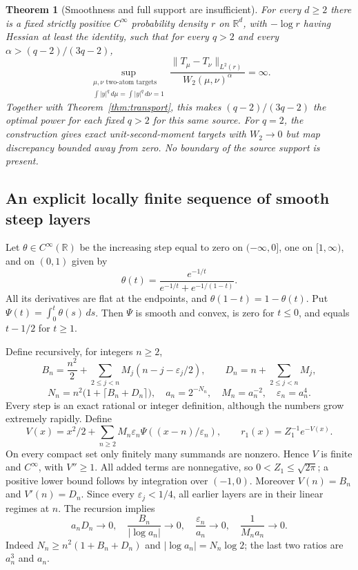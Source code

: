 \documentclass[11pt]{article}
\newtheorem{theorem}{Theorem}[section]
\theoremstyle{remark}\newtheorem{remark}[theorem]{Remark}
\newcommand{\R}{\mathbb R}\newcommand{\Var}{\operatorname{Var}}
\newcommand{\norm}[1]{\lVert#1\rVert}\newcommand{\ind}{\mathbf 1}
\begin{document}
\begin{theorem}[Smoothness and full support are insufficient]\label{thm:steep}
For every $d\ge2$ there is a fixed strictly positive $C^\infty$ probability density $r$ on $\R^d$, with $-\log r$ having Hessian at least the identity, such that for every $q>2$ and every
$\alpha>(q-2)/(3q-2)$,
\[
 \sup_{\substack{\mu,\nu\text{ two-atom targets}\\
       \int|y|^q\,d\mu=\int|y|^q\,d\nu=1}}
 \frac{\norm{T_\mu-T_\nu}_{L^2(r)}}{W_2(\mu,\nu)^\alpha}
 =\infty.
\]
Together with Theorem~\ref{thm:transport}, this makes $(q-2)/(3q-2)$ the optimal power for each fixed $q>2$ for this same source. For $q=2$, the construction gives exact unit-second-moment targets with $W_2\to0$ but map discrepancy bounded away from zero. No boundary of the source support is present.
\end{theorem}

\subsection*{An explicit locally finite sequence of smooth steep layers}
Let $\theta\in C^\infty(\R)$ be the increasing step equal to zero on $(-\infty,0]$, one on $[1,\infty)$, and on $(0,1)$ given by
\[
 \theta(t)=\frac{e^{-1/t}}{e^{-1/t}+e^{-1/(1-t)}}.
\]
All its derivatives are flat at the endpoints, and $\theta(1-t)=1-\theta(t)$. Put $\Psi(t)=\int_0^t\theta(s)\,ds$. Then $\Psi$ is smooth and convex, is zero for $t\le0$, and equals $t-1/2$ for $t\ge1$.

Define recursively, for integers $n\ge2$,
\[
 B_n=\frac{n^2}{2}+\sum_{2\le j<n}M_j(n-j-\varepsilon_j/2),
 \qquad D_n=n+\sum_{2\le j<n}M_j,
\]
\begin{equation}\label{eq:layer-parameters}
 N_n=n^2\bigl(1+\lceil B_n+D_n\rceil\bigr),\quad
 a_n=2^{-N_n},\quad M_n=a_n^{-2},\quad\varepsilon_n=a_n^4.
\end{equation}
Every step is an exact rational or integer definition, although the numbers grow extremely rapidly. Define
\begin{equation}\label{eq:steep-potential}
 V(x)=x^2/2+\sum_{n\ge2}M_n\varepsilon_n
                       \Psi((x-n)/\varepsilon_n),\qquad
 r_1(x)=Z_1^{-1}e^{-V(x)}.
\end{equation}
On every compact set only finitely many summands are nonzero. Hence $V$ is finite and $C^\infty$, with $V''\ge1$. All added terms are nonnegative, so $0<Z_1\le\sqrt{2\pi}$; a positive lower bound follows by integration over $(-1,0)$. Moreover $V(n)=B_n$ and $V'(n)=D_n$. Since every $\varepsilon_j<1/4$, all earlier layers are in their linear regimes at $n$. The recursion implies
\begin{equation}\label{eq:layer-limits}
 a_nD_n\longrightarrow0,\quad
 \frac{B_n}{|\log a_n|}\longrightarrow0,\quad
 \frac{\varepsilon_n}{a_n}\longrightarrow0,\quad
 \frac1{M_na_n}\longrightarrow0.
\end{equation}
Indeed $N_n\ge n^2(1+B_n+D_n)$ and $|\log a_n|=N_n\log2$; the last two ratios are $a_n^3$ and $a_n$.
\end{document}
